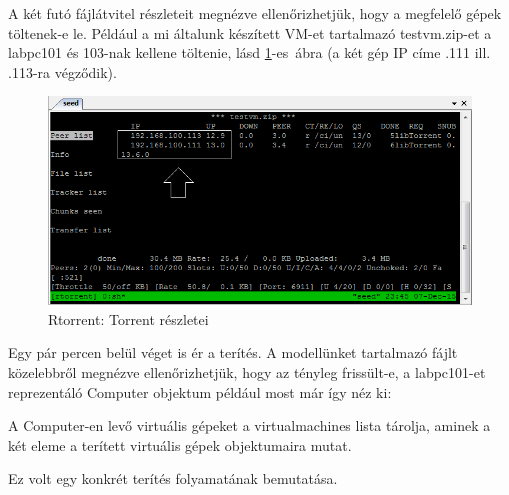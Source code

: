 A két futó fájlátvitel részleteit megnézve ellenőrizhetjük, hogy a megfelelő gépek töltenek-e le. Például a mi általunk készített VM-et tartalmazó testvm.zip-et a labpc101 és 103-nak kellene töltenie, lásd \ref{fig:seed_peers}-es~ábra (a két gép IP címe .111 ill. .113-ra végződik).

\begin{figure}[ht]
\centering
\includegraphics[width=140mm, keepaspectratio]{figures/test_seed_peers.png}
\caption{Rtorrent: Torrent részletei}
\label{fig:seed_peers}
\end{figure}

Egy pár percen belül véget is ér a terítés. A modellünket tartalmazó fájlt közelebbről megnézve ellenőrizhetjük, hogy az tényleg frissült-e, a labpc101-et reprezentáló Computer objektum például most már így néz ki:


A Computer-en levő virtuális gépeket a virtualmachines lista tárolja, aminek a két eleme a terített virtuális gépek objektumaira mutat.

Ez volt egy konkrét terítés folyamatának bemutatása.
